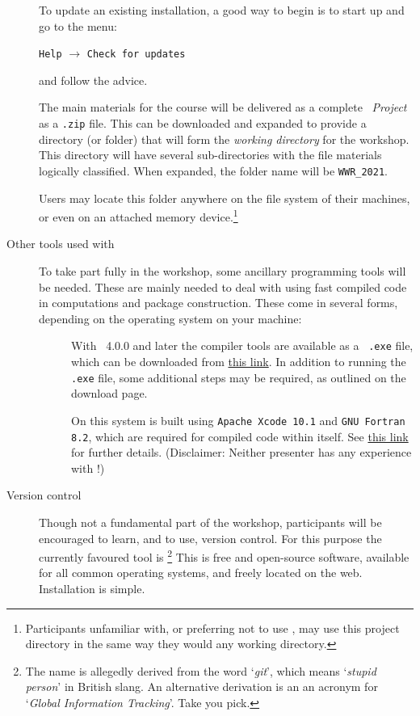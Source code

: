 \documentclass[12pt]{article}
\begin{document}
\begin{description}
  To update an existing installation, a good way to begin is to start
  up \RStudio and go to the menu:
  \begin{center}
    \texttt{Help} $\longrightarrow$ \texttt{Check for updates}
  \end{center}
  and follow the advice.
  
  The main materials for the course will be delivered as a complete
  \RStudio~\emph{Project} as a \verb|.zip| file.  This can be
  downloaded and expanded to provide a directory (or folder) that will
  form the \emph{working directory} for the workshop.  This directory
  will have several sub-directories with the file materials logically
  classified.  When expanded, the folder name will be \verb|WWR_2021|.

  Users may locate this folder anywhere on the file system of their
  machines, or even on an attached memory
  device.\footnote{Participants unfamiliar with, or preferring not to
    use \RStudio, may use this project directory in the same way they
    would any \R working directory.}
\item[Other tools used with \R] To take part fully in the workshop,
  some ancillary programming tools will be needed.  These are mainly
  needed to deal with using fast compiled code in computations and
  package construction. These come in several forms, depending on the
  operating system on your machine:
  \begin{description}
  \item[\Windows] With \R~4.0.0 and later the compiler tools are
    available as a \Windows~\verb|.exe| file, which can be downloaded
    from \href{https://cloud.r-project.org/bin/windows/Rtools/}{this
      link}.  In addition to running the \verb|.exe| file, some
    additional steps may be required, as outlined on the download
    page.
  \item[\MacOS] On this system \R is built using
    \verb|Apache Xcode 10.1| and \verb|GNU Fortran 8.2|, which are
    required for compiled code within \R itself.  See
    \href{https://cloud.r-project.org/bin/macosx/tools/}{this link}
    for further details. (Disclaimer: Neither presenter has any
    experience with \MacOS!)
  \end{description}
\item[Version control] Though not a fundamental part of the workshop,
  participants will be encouraged to learn, and to use, version
  control.  For this purpose the currently favoured tool is
  \git\footnote{The name is allegedly derived from the word
    `\emph{git}', which means `\emph{stupid person}' in British slang.
    An alternative derivation is an an acronym for `\emph{Global
      Information Tracking}'.  Take you pick.}  This is free and
  open-source software, available for all common operating systems,
  and freely located on the web.  Installation is simple.


\end{description}
\end{document}
